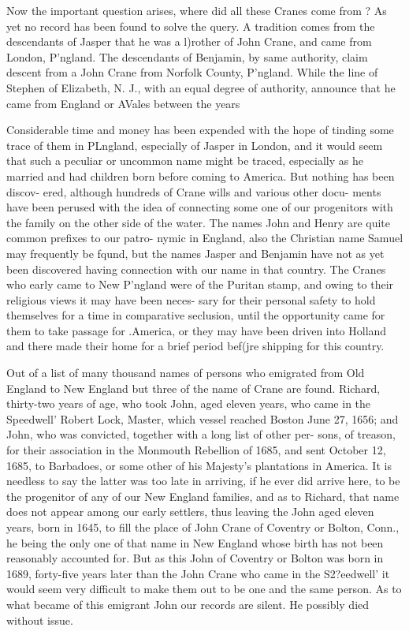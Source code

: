 \documentclass{book}
\begin{document}
Now the important question arises, where did all these Cranes 
come from ? As yet no record has been found to solve the query. 
A tradition comes from the descendants of Jasper that he was a 
l)rother of John Crane, and came from London, P'ngland. The 
descendants of Benjamin, by same authority, claim descent from 
a John Crane from Norfolk County, P'ngland. While the line of 
Stephen of Elizabeth, N. J., with an equal degree of authority, 
announce that he came from England or AVales between the years 




Considerable time and money has been expended with the hope 
of tinding some trace of them in PLngland, especially of Jasper in 
London, and it would seem that such a peculiar or uncommon 
name might be traced, especially as he married and had children 
born before coming to America. But nothing has been discov- 
ered, although hundreds of Crane wills and various other docu- 
ments have been perused with the idea of connecting some one of 
our progenitors with the family on the other side of the water. 
The names John and Henry are quite common prefixes to our patro- 
nymic in England, also the Christian name Samuel may frequently 
be fqund, but the names Jasper and Benjamin have not as yet 
been discovered having connection with our name in that country. 
The Cranes who early came to New P'ngland were of the Puritan 
stamp, and owing to their religious views it may have been neces- 
sary for their personal safety to hold themselves for a time in 
comparative seclusion, until the opportunity came for them to 
take passage for .America, or they may have been driven into 
Holland and there made their home for a brief period bef(jre 
shipping for this country. 

Out of a list of many thousand names of persons who emigrated 
from Old England to New England but three of the name of 
Crane are found. Richard, thirty-two years of age, who took 
John, aged eleven years, who came in the Speedwell' Robert 
Lock, Master, which vessel reached Boston June 27, 1656; and 
John, who was convicted, together with a long list of other per- 
sons, of treason, for their association in the Monmouth Rebellion 
of 1685, and sent October 12, 1685, to Barbadoes, or some other 
of his Majesty's plantations in America. It is needless to say the 
latter was too late in arriving, if he ever did arrive here, to be 
the progenitor of any of our New England families, and as to 
Richard, that name does not appear among our early settlers, 
thus leaving the John aged eleven years, born in 1645, to fill the 
place of John Crane of Coventry or Bolton, Conn., he being the 
only one of that name in New England whose birth has not been 
reasonably accounted for. But as this John of Coventry or 
Bolton was born in 1689, forty-five years later than the John 
Crane who came in the S2?eedwell' it would seem very difficult to 
make them out to be one and the same person. As to what 
became of this emigrant John our records are silent. He possibly 
died without issue. 
\end{document}
